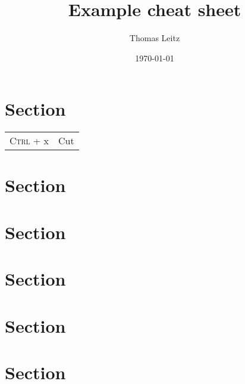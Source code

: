 \documentclass[10pt,a4paper,landscape,oneside]{scrartcl}
\title{Example cheat sheet}
\author{Thomas Leitz}
\date{\today}
\begin{document}
\raggedcolumns

\begin{multicols*}{4}
  
\maketitle
\section*{Section}
\begin{tabularx}{\linewidth}{@{}lr@{}}
\textsc{Ctrl} + x & Cut
\end{tabularx}
\section*{Section}
\blindtext[2]
\section*{Section}
\blindtext[2]
\section*{Section}
\blindtext[2]
\section*{Section}
\blindtext[2]
\section*{Section}
\blindtext[1]

\end{multicols*}
\end{document}
